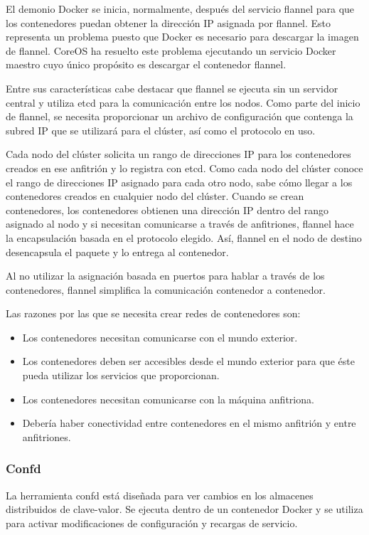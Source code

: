 El demonio Docker se inicia, normalmente, después del servicio flannel para que los contenedores puedan obtener la dirección IP asignada por flannel. Esto representa un problema puesto que Docker es necesario para descargar la imagen de flannel. CoreOS ha resuelto este problema ejecutando un servicio Docker maestro cuyo único propósito es descargar el contenedor flannel.

Entre sus características cabe destacar que flannel se ejecuta sin un servidor central y utiliza etcd para la comunicación entre los nodos. Como parte del inicio de flannel, se necesita proporcionar un archivo de configuración que contenga la subred IP que se utilizará para el clúster, así como el protocolo en uso.

Cada nodo del clúster solicita un rango de direcciones IP para los contenedores creados en ese anfitrión y lo registra con etcd. Como cada nodo del clúster conoce el rango de direcciones IP asignado para cada otro nodo, sabe cómo llegar a los contenedores creados en cualquier nodo del clúster. Cuando se crean contenedores, los contenedores obtienen una dirección IP dentro del rango asignado al nodo y si necesitan comunicarse a través de anfitriones, flannel hace la encapsulación basada en el protocolo elegido. Así, flannel en el nodo de destino desencapsula el paquete y lo entrega al contenedor.

Al no utilizar la asignación basada en puertos para hablar a través de los contenedores, flannel simplifica la comunicación contenedor a contenedor.

Las razones por las que se necesita crear redes de contenedores son:
\begin{itemize}
\item Los contenedores necesitan comunicarse con el mundo exterior.
\item Los contenedores deben ser accesibles desde el mundo exterior para que éste pueda utilizar los servicios que proporcionan.
\item Los contenedores necesitan comunicarse con la máquina anfitriona.
\item Debería haber conectividad entre contenedores en el mismo anfitrión y entre anfitriones.
\end{itemize}

\subsubsection{Confd}

La herramienta confd está diseñada para ver cambios en los almacenes distribuidos de clave-valor. Se ejecuta dentro de un contenedor Docker y se utiliza para activar modificaciones de configuración y recargas de servicio.

